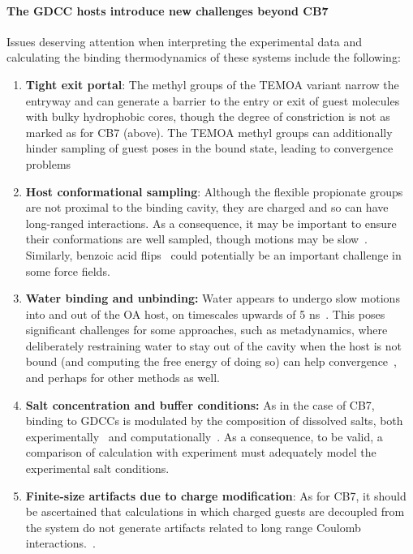 \documentclass[aps,pre,twocolumn,nofootinbib,superscriptaddress,10pt, final,tightenlines]{revtex4-1}
\begin{document}
\paragraph{The GDCC hosts introduce new challenges beyond CB7} Issues deserving attention when interpreting the experimental data and calculating the binding thermodynamics of these systems include the following:

\begin{enumerate}
\item{{\bf Tight exit portal}: The methyl groups of the TEMOA variant narrow the entryway and can generate a barrier to the entry or exit of guest molecules with bulky hydrophobic cores, though the degree of constriction is not as marked as for CB7 (above). 
The TEMOA methyl groups can additionally hinder sampling of guest poses in the bound state, leading to convergence problems~\cite{yin_overview_2016}}

\item{{\bf Host conformational sampling}: Although the flexible propionate groups are not proximal to the binding cavity, they are charged and so can have long-ranged interactions. 
As a consequence, it may be important to ensure their conformations are well sampled, though motions may be slow~\cite{mikulskis_free-energy_2014}. 
Similarly, benzoic acid flips~\cite{yin_sampl5_2016, tofoleanu_absolute_2016} could potentially be an important challenge in some force fields.}

\item{{\bf Water binding and unbinding:} Water appears to undergo slow motions into and out of the OA host, on timescales upwards of 5 ns~\cite{ewell_water_2008}. 
This poses significant challenges for some approaches, such as metadynamics, where deliberately restraining water to stay out of the cavity when the host is not bound (and computing the free energy of doing so) can help convergence~\cite{bhakat_resolving_2016}, and perhaps for other methods as well.}

\item{{\bf Salt concentration and buffer conditions:} As in the case of CB7, binding to GDCCs is modulated by the composition of dissolved salts, both experimentally~\cite{gibb_anion_2011, sokkalingam_binding_2016} and computationally~\cite{pal_combined_2016, tofoleanu_absolute_2016}. As a consequence, to be valid, a comparison of calculation with experiment must adequately model the experimental salt conditions.
}

\item{{\bf Finite-size artifacts due to charge modification}: As for CB7, it should be ascertained that calculations in which charged guests are decoupled from the system do not generate artifacts related to long range Coulomb interactions.~\cite{rocklin_calculating_2013, lin_overview_2014, reif_net_2014, simonson_concepts_2016}.}


\end{enumerate}
\end{document}
